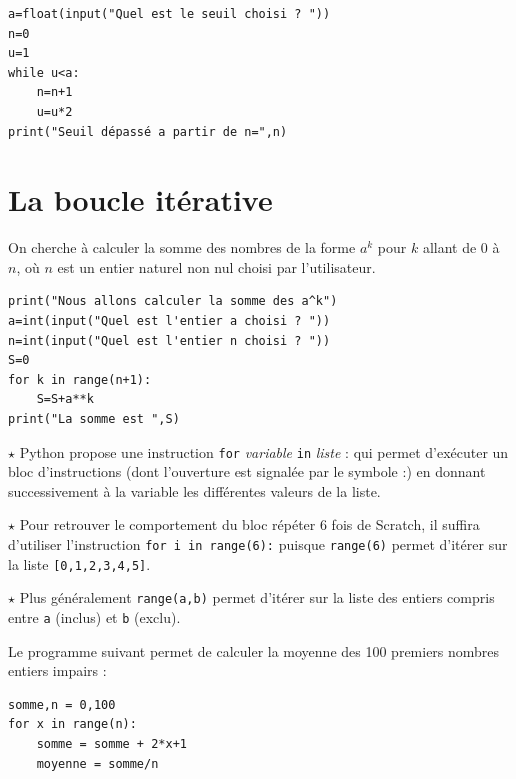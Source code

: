 \begin{lstlisting}
a=float(input("Quel est le seuil choisi ? "))
n=0
u=1
while u<a:
    n=n+1
    u=u*2
print("Seuil dépassé a partir de n=",n)
\end{lstlisting}




\section{La boucle itérative}

On cherche à calculer la somme des nombres de la forme $a^k$ pour $k$ allant de 0 à $n$, où $n$ est un entier naturel non nul choisi par l'utilisateur.

\begin{lstlisting}
print("Nous allons calculer la somme des a^k")
a=int(input("Quel est l'entier a choisi ? "))
n=int(input("Quel est l'entier n choisi ? "))
S=0
for k in range(n+1):
    S=S+a**k
print("La somme est ",S)
\end{lstlisting}

\begin{Rmq}[s]
$\star$ Python propose une instruction \og \verb!for! \textit{variable} \verb!in! \textit{liste} :\fg{} qui permet d'exécuter un bloc d'instructions (dont l'ouverture est signalée par le symbole :) en donnant successivement à la variable les différentes valeurs de la liste.

$\star$ Pour retrouver le comportement du bloc répéter 6 fois de Scratch, il suffira d'utiliser l'instruction \og \verb!for i in range(6):!\fg{} puisque \verb!range(6)! permet d'itérer sur la liste \verb![0,1,2,3,4,5]!. 

$\star$ Plus généralement \verb!range(a,b)! permet d'itérer sur la liste des entiers compris entre \verb!a! (inclus) et \verb!b! (exclu).
\end{Rmq}

\begin{Exemple}[]{}
Le programme suivant permet de calculer la moyenne des 100 premiers nombres entiers impairs :
\end{Exemple}

\begin{lstlisting}
somme,n = 0,100
for x in range(n):
	somme = somme + 2*x+1
	moyenne = somme/n
\end{lstlisting}



